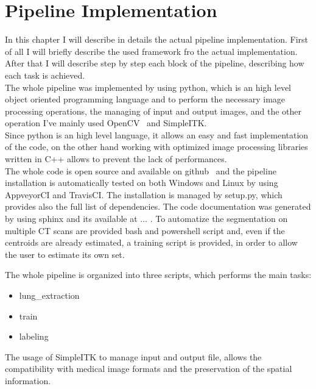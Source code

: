 
	
	\section{Pipeline Implementation}
	
	In this chapter I will describe in details the actual pipeline implementation. First of all I will briefly describe the used framework fro the actual implementation. After that I will describe step by step each block of the pipeline, describing how each task is achieved.\\
	
	The whole pipeline was implemented by using python, which is an high level object oriented programming language and to perform the necessary image processing operations, the managing of input and output images, and the other operation I've mainly used OpenCV~\cite{OpenCV} and SimpleITK.\\
	Since python is an high level language, it allows an easy and fast implementation of the code, on the other hand working with optimized image processing libraries written in C++ allows to prevent the lack of performances.\\
		
	The whole code is open source and available on github~\cite{REP:CTLungSeg} and the pipeline installation is automatically tested on both Windows and Linux by using AppveyorCI and TravisCI.  The installation is managed by setup.py, which provides also the full list of dependencies. The code documentation was generated by using sphinx and its available at ... . To automatize the segmentation on multiple CT scans are provided bash and powershell script and,  even if the centroids are already estimated, a training script is provided, in order to allow the user to estimate its own set.
	
	The whole pipeline is organized into three scripts, which performs the main tasks: 
	\begin{itemize}
		\item lung\_extraction
		\item train
		\item labeling
	\end{itemize}

	The usage of SimpleITK to manage input and output file, allows the compatibility with medical image formats and the preservation of the spatial information.
 
